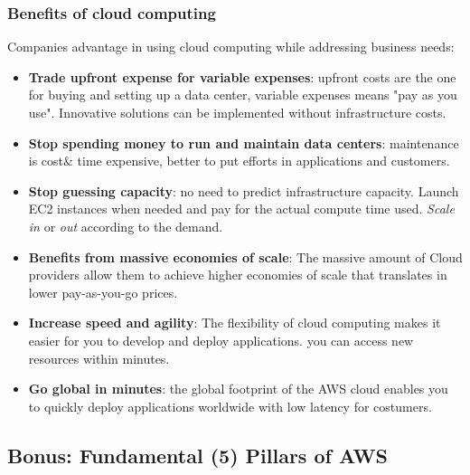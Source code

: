 \documentclass{article}
\theoremstyle{definition}
\begin{document}
\subsubsection{Benefits of cloud computing}
Companies advantage in using cloud computing while addressing business needs:
\begin{itemize}
    \item \textbf{Trade upfront expense for variable expenses}: upfront costs are the one for buying and setting up a data center, variable expenses means "pay as you use". Innovative solutions can be implemented without infrastructure costs.
    \item \textbf{Stop spending money to run and maintain data centers}: maintenance is cost\& time expensive, better to put efforts in applications and customers.
    \item \textbf{Stop guessing capacity}: no need to predict infrastructure capacity. Launch EC2 instances when needed and pay for the actual compute time used. \textit{Scale in }or \textit{out} according to the demand.
    \item \textbf{Benefits from massive economies of scale}: The massive amount of Cloud providers allow them to achieve higher economies of scale that translates in lower pay-as-you-go prices.
    \item \textbf{Increase speed and agility}: The flexibility of cloud computing makes it easier for you to develop and deploy applications. you can access new resources within minutes.
    \item \textbf{Go global in minutes}: the global footprint of the AWS cloud enables you to quickly deploy applications worldwide with low latency for costumers.
\end{itemize}

\subsection{Bonus: Fundamental (5) Pillars of AWS}
\end{document}
